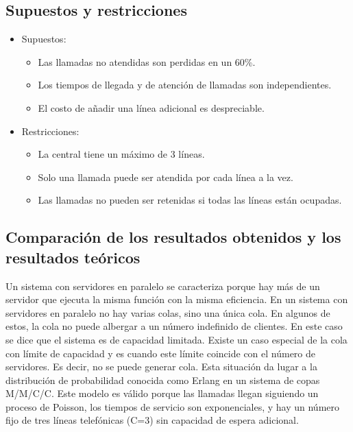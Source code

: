 \documentclass{article}
\begin{document}
			\subsection*{Supuestos y restricciones}
				\begin{itemize}
					\item Supuestos:
						\begin{itemize}
							\item Las llamadas no atendidas son perdidas en un 60\%.
							\item Los tiempos de llegada y de atención de llamadas son independientes.
							\item El costo de añadir una línea adicional es despreciable.
						\end{itemize}
					\item Restricciones:
						\begin{itemize}
							\item La central tiene un máximo de 3 líneas.
							\item Solo una llamada puede ser atendida por cada línea a la vez.
							\item Las llamadas no pueden ser retenidas si todas las líneas están ocupadas.
						\end{itemize}
				\end{itemize}
					
			\subsection*{Comparación de los resultados obtenidos y los resultados teóricos}
		
			Un sistema con servidores en paralelo se caracteriza porque hay más de un servidor que ejecuta la misma función con la misma eficiencia. En un sistema con servidores en paralelo no hay varias colas, sino una única cola. En algunos de estos, la cola no puede albergar a un número indefinido de clientes. En este caso se dice que el sistema es de capacidad limitada. 
			Existe un caso especial de la cola con límite de capacidad y es cuando este límite coincide con el número de servidores. Es decir, no se puede generar cola.
			Esta situación da lugar a la distribución de probabilidad conocida como Erlang en un sistema de copas M/M/C/C.
			Este modelo es válido porque las llamadas llegan siguiendo un proceso de Poisson, los tiempos de servicio son exponenciales, y hay un número fijo de tres líneas telefónicas (C=3) sin capacidad de espera adicional.
			
\end{document}
